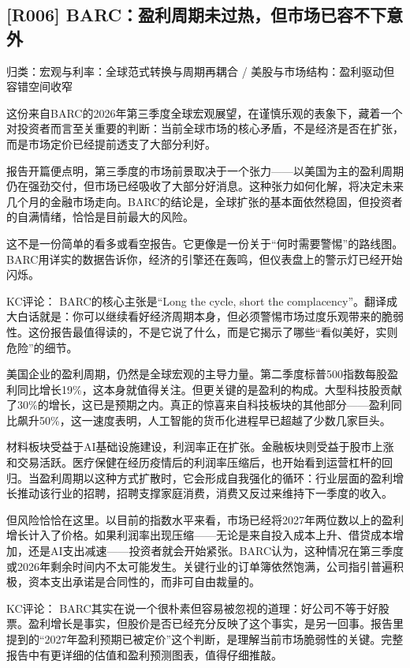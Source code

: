 \documentclass[11pt]{ctexart}
\begin{document}
\subsection{[R006] BARC：盈利周期未过热，但市场已容不下意外}
{\small\color{refgray}归类：宏观与利率：全球范式转换与周期再耦合 / 美股与市场结构：盈利驱动但容错空间收窄}

这份来自BARC的2026年第三季度全球宏观展望，在谨慎乐观的表象下，藏着一个对投资者而言至关重要的判断：当前全球市场的核心矛盾，不是经济是否在扩张，而是市场定价已经提前透支了大部分利好。

报告开篇便点明，第三季度的市场前景取决于一个张力——以美国为主的盈利周期仍在强劲交付，但市场已经吸收了大部分好消息。这种张力如何化解，将决定未来几个月的金融市场走向。BARC的结论是，全球扩张的基本面依然稳固，但投资者的自满情绪，恰恰是目前最大的风险。

这不是一份简单的看多或看空报告。它更像是一份关于“何时需要警惕”的路线图。BARC用详实的数据告诉你，经济的引擎还在轰鸣，但仪表盘上的警示灯已经开始闪烁。

KC评论： BARC的核心主张是“Long the cycle, short the complacency”。翻译成大白话就是：你可以继续看好经济周期本身，但必须警惕市场过度乐观带来的脆弱性。这份报告最值得读的，不是它说了什么，而是它揭示了哪些“看似美好，实则危险”的细节。

美国企业的盈利周期，仍然是全球宏观的主导力量。第二季度标普500指数每股盈利同比增长19\%，这本身就值得关注。但更关键的是盈利的构成。大型科技股贡献了30\%的增长，这已是预期之内。真正的惊喜来自科技板块的其他部分——盈利同比飙升50\%，这一速度表明，人工智能的货币化进程早已超越了少数几家巨头。

材料板块受益于AI基础设施建设，利润率正在扩张。金融板块则受益于股市上涨和交易活跃。医疗保健在经历疫情后的利润率压缩后，也开始看到运营杠杆的回归。当盈利周期以这种方式扩散时，它会形成自我强化的循环：行业层面的盈利增长推动该行业的招聘，招聘支撑家庭消费，消费又反过来维持下一季度的收入。

但风险恰恰在这里。以目前的指数水平来看，市场已经将2027年两位数以上的盈利增长计入了价格。如果利润率出现压缩——无论是来自投入成本上升、借贷成本增加，还是AI支出减速——投资者就会开始紧张。BARC认为，这种情况在第三季度或2026年剩余时间内不太可能发生。关键行业的订单簿依然饱满，公司指引普遍积极，资本支出承诺是合同性的，而非可自由裁量的。

KC评论： BARC其实在说一个很朴素但容易被忽视的道理：好公司不等于好股票。盈利增长是事实，但股价是否已经充分反映了这个事实，是另一回事。报告里提到的“2027年盈利预期已被定价”这个判断，是理解当前市场脆弱性的关键。完整报告中有更详细的估值和盈利预测图表，值得仔细推敲。
\end{document}

